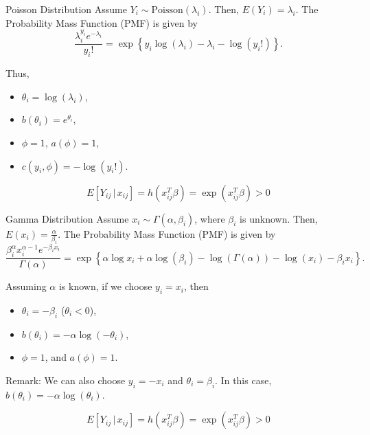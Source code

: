 \documentclass[UTF8,a4paper,10pt]{article}
\begin{document}
\pagebreak
  
\begin{mybox}{Poisson Distribution}
Assume $Y_i \sim \text{Poisson}(\lambda_i)$. Then, $E(Y_i) = \lambda_i$. The Probability Mass Function (PMF) is given by
\[
\frac{\lambda_i^{y_i}e^{-\lambda_i}}{y_i!} = \exp\left\{y_i\log(\lambda_i) - \lambda_i - \log(y_i!)\right\}.
\]

Thus, 
\begin{itemize}
  \item $\theta_i = \log(\lambda_i)$, 
  \item $b(\theta_i) = e^{\theta_i}$, 
  \item $\phi = 1$, $a(\phi) = 1$, 
  \item $c(y_i, \phi) = -\log(y_i!)$.
\end{itemize}

\[E[Y_{ij}\,|\, x_{ij}] = h(x_{ij}^T\beta) = \exp(x_{ij}^T\beta)>0\]


\end{mybox}

  
\begin{mybox}{Gamma Distribution}
Assume $x_i \sim \Gamma(\alpha, \beta_i)$, where $\beta_i$ is unknown. Then, $E(x_i) = \frac{\alpha}{\beta_i}$. The Probability Mass Function (PMF) is given by
\[
\frac{\beta_i^\alpha x_i^{\alpha-1} e^{-\beta_i x_i}}{\Gamma(\alpha)} = \exp\left\{\alpha\log x_i + \alpha\log(\beta_i) - \log(\Gamma(\alpha)) - \log(x_i) - \beta_i x_i\right\}.
\]

Assuming $\alpha$ is known, if we choose $y_i = x_i$, then 
\begin{itemize}
  \item $\theta_i = -\beta_i$ ($\theta_i < 0$), 
  \item $b(\theta_i) = -\alpha\log(-\theta_i)$, 
  \item $\phi = 1$, and $a(\phi) = 1$.
\end{itemize}

Remark: We can also choose 
$y_i = -x_i$ and $\theta_i = \beta_i$. In this case, $b(\theta_i) = -\alpha\log(\theta_i)$.

\[E[Y_{ij}\,|\, x_{ij}] = h(x_{ij}^T\beta) = \exp(x_{ij}^T\beta)>0\]


\end{mybox}
\end{document}
